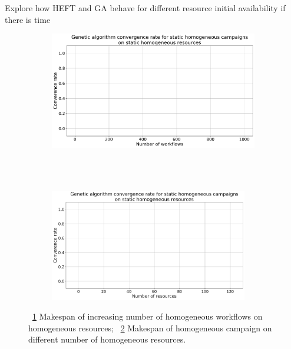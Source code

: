 Explore how HEFT and GA behave for different resource initial availability if there is time
\begin{figure}[ht!]
    \centering
    \begin{subfigure}[b]{0.85\textwidth}
        \includegraphics[width=.95\textwidth]{figures/campaign/StHomoCampaigns_4VarHomoResources.pdf}
        \caption{}
        \label{fig:StHomoCampaigns_4VarHomoResources}
    \end{subfigure}\\
    ~ 
    \begin{subfigure}[b]{0.85\textwidth}
        \includegraphics[width=0.95\textwidth]{figures/campaign/VarHomoResources_StHomoCampaigns.pdf}
        \caption{}
        \label{fig:VarHomoResources_StHomoCampaigns}
    \end{subfigure}
    \caption{~\ref{fig:StHomoCampaigns_4VarHomoResources} Makespan of increasing number of homogeneous workflows on homogeneous resources;
    ~\ref{fig:VarHomoResources_StHomoCampaigns} Makespan of homogeneous campaign on different number of homogeneous resources.}
    \label{fig:resource_avail}
\end{figure}

